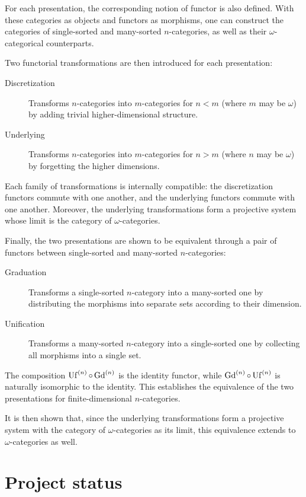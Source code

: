 For each presentation, the corresponding notion of functor is also defined. With these categories as
objects and functors as morphisms, one can construct the categories of single-sorted and many-sorted
$n$-categories, as well as their $\omega$-categorical counterparts.

Two functorial transformations are then introduced for each presentation:
\begin{description}
  \item[Discretization] Transforms $n$-categories into $m$-categories for $n < m$ (where $m$ may be
    $\omega$) by adding trivial higher-dimensional structure.
  \item[Underlying] Transforms $n$-categories into $m$-categories for $n > m$ (where $n$ may be
    $\omega$) by forgetting the higher dimensions.
\end{description}

Each family of transformations is internally compatible: the discretization functors commute with
one another, and the underlying functors commute with one another. Moreover, the underlying
transformations form a projective system whose limit is the category of $\omega$-categories.

Finally, the two presentations are shown to be equivalent through a pair of functors between
single-sorted and many-sorted $n$-categories:
\begin{description}
  \item[Graduation] Transforms a single-sorted $n$-category into a many-sorted one by distributing
    the morphisms into separate sets according to their dimension.
  \item[Unification] Transforms a many-sorted $n$-category into a single-sorted one by collecting
    all morphisms into a single set.
\end{description}

The composition $\operatorname{Uf}^{(n)} \circ \operatorname{Gd}^{(n)}$ is the identity functor, while $\operatorname{Gd}^{(n)} \circ
\operatorname{Uf}^{(n)}$ is naturally isomorphic to the identity. This establishes the equivalence of the two
presentations for finite-dimensional $n$-categories.

It is then shown that, since the underlying transformations form a projective system with the
category of $\omega$-categories as its limit, this equivalence extends to $\omega$-categories as
well.

\section{Project status}

